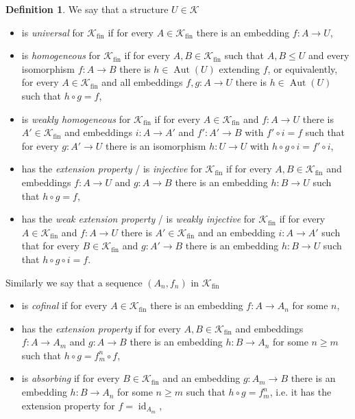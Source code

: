 \documentclass[10pt,a4paper]{article}
\theoremstyle{definition}
\newtheorem{df}[tw]{Definition}
\theoremstyle{remark}
\newcommand \maps {\colon} %
\newcommand \id [1]{{\operatorname{id}_{#1}}}
\newcommand \cmp {\circ} %
\newcommand \K {\mathscr{K}}
\newcommand \fin {{\operatorname{fin}}}
\newcommand \Aut {\operatorname{Aut}}
\begin{document}
\begin{df} \label{def:Fraisse}
We say that a structure $U \in \K$ 
\begin{itemize}
    \item is \emph{universal} for $\K_\fin$  if for every $A \in \K_\fin$ there is an embedding $f\maps A \to U$,
    
    \item is \emph{homogeneous} for $\K_\fin$ if for every $A, B \in \K_\fin$ such that $A, B \leq U$ and every isomorphism $f\maps A \to B$ there is $h \in \Aut(U)$ extending $f$, or equivalently, for every $A \in \K_\fin$ and all embeddings $f, g\maps A \to U$ there is $h \in \Aut(U)$ such that $h \cmp g  = f$,
    
    \item is \emph{weakly homogeneous} for $\K_\fin$ if for every $A \in \K_\fin$ and $f\maps A \to U$ there is $A' \in \K_\fin$ and embeddings $i\maps A \to A'$ and $f'\maps A' \to B$ with $f' \cmp i = f$ such that for every $g\maps A' \to U$ there is an isomorphism $h\maps U \to U$ with $h \cmp g \cmp i = f' \cmp i$,
    
    \item has the \emph{extension property} / is \emph{injective} for $\K_\fin$ if for every $A, B \in \K_\fin$ and embeddings $f\maps A \to U$ and $g\maps A \to B$ there is an embedding $h\maps B \to U$ such that $h \cmp g = f$,
    
    \item has the \emph{weak extension property} / is \emph{weakly injective} for $\K_\fin$ if for every $A \in \K_\fin$ and $f\maps A \to U$ there is $A' \in \K_\fin$ and an embedding $i\maps A \to A'$ such that for every $B \in \K_\fin$ and $g\maps A' \to B$ there is an embedding $h\maps B \to U$ such that $h \cmp g \cmp i = f$.
\end{itemize}
Similarly we say that a sequence $(A_n, f_n)$ in $\K_\fin$ 
\begin{itemize}
    \item is \emph{cofinal} if for every $A \in \K_\fin$ there is an embedding $f\maps A \to A_n$ for some $n$,
    
    \item has the \emph{extension property} if for every $A, B \in \K_\fin$ and embeddings $f\maps A \to A_m$ and $g\maps A \to B$ there is an embedding $h\maps B \to A_n$ for some $n \geq m$ such that $h \cmp g = f^n_m \cmp f$,
    
    \item is \emph{absorbing} if for every $B \in \K_\fin$ and an embedding $g\maps A_m \to B$ there is an embedding $h\maps B \to A_n$ for some $n \geq m$ such that $h \cmp g = f^n_m$, i.e. it has the extension property for $f = \id{A_m}$,


\end{itemize}
\end{df}
\end{document}
